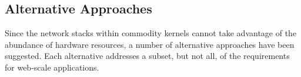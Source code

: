 



\subsection{Alternative Approaches}
\label{sec:motivation:current}


Since the network stacks within commodity kernels cannot take
advantage of the abundance of hardware resources, a number of
alternative approaches have been suggested. Each alternative addresses
a subset, but not all, of the requirements for web-scale applications.

